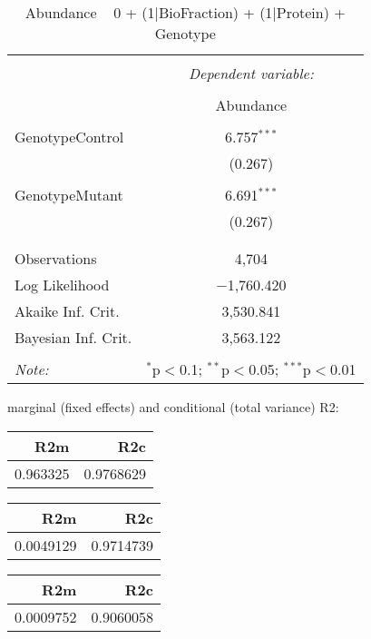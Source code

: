 \documentclass[11pt]{report}
\begin{document}
\begin{table}[!htbp] \centering 
  \caption{Abundance ~ 0 + (1|BioFraction) + (1|Protein) + Genotype} 
  \label{} 
\begin{tabular}{@{\extracolsep{5pt}}lc} 
\\[-1.8ex]\hline 
\hline \\[-1.8ex] 
 & \multicolumn{1}{c}{\textit{Dependent variable:}} \\ 
\cline{2-2} 
\\[-1.8ex] & Abundance \\ 
\hline \\[-1.8ex] 
 GenotypeControl & 6.757$^{***}$ \\ 
  & (0.267) \\ 
  & \\ 
 GenotypeMutant & 6.691$^{***}$ \\ 
  & (0.267) \\ 
  & \\ 
\hline \\[-1.8ex] 
Observations & 4,704 \\ 
Log Likelihood & $-$1,760.420 \\ 
Akaike Inf. Crit. & 3,530.841 \\ 
Bayesian Inf. Crit. & 3,563.122 \\ 
\hline 
\hline \\[-1.8ex] 
\textit{Note:}  & \multicolumn{1}{r}{$^{*}$p$<$0.1; $^{**}$p$<$0.05; $^{***}$p$<$0.01} \\ 
\end{tabular} 
\end{table} 
marginal (fixed effects) and conditional (total variance) R2:

\begin{tabular}{r|r}
\hline
R2m & R2c\\
\hline
0.963325 & 0.9768629\\
\hline
\end{tabular}

\begin{tabular}{r|r}
\hline
R2m & R2c\\
\hline
0.0049129 & 0.9714739\\
\hline
\end{tabular}

\begin{tabular}{r|r}
\hline
R2m & R2c\\
\hline
0.0009752 & 0.9060058\\
\hline
\end{tabular}
\end{document}
